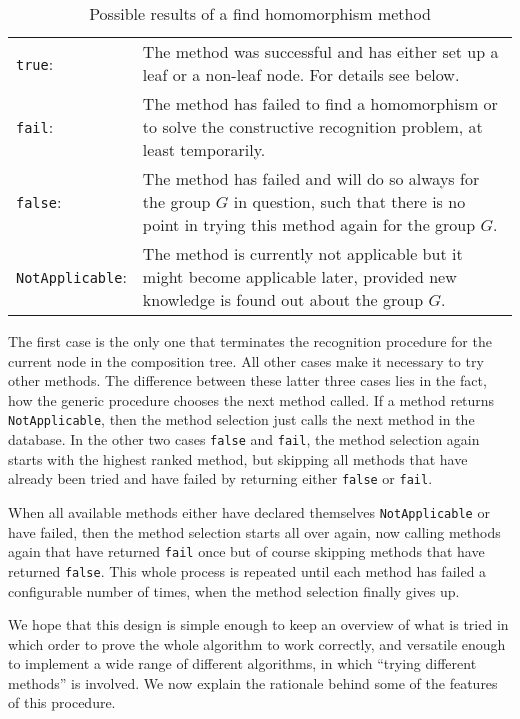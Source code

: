 \begin{table}[ht]
\begin{tabular}{lp{4in}}
\texttt{true}: &
   The method was successful and has either set up a
   leaf or a non-leaf node. For details see below. \\
\texttt{fail}: &
   The method has failed to find a homomorphism or
   to solve the constructive recognition problem, at least temporarily. \\
\texttt{false}: &
   The method has failed and will do so always for
   the group $G$ in question, such that there is no point in trying
   this method again for the group $G$. \\
\texttt{NotApplicable}: &
   The method is currently not applicable
   but it might become applicable later, provided new knowledge is
   found out about the group $G$.
\end{tabular}
\caption{Possible results of a find homomorphism method}
\label{methselresults}
\end{table}

The first case is the only one that terminates the recognition procedure
for the current node in the composition tree.
All other cases make it necessary to try other methods. The difference
between these latter three cases lies in the fact, how the generic
procedure chooses the next method called. If a method returns
\texttt{NotApplicable}, then the method selection just calls the next
method in the database. In the other two cases \texttt{false} and 
\texttt{fail}, the method selection again starts with the highest ranked
method, but skipping all methods that have already been tried and
have failed by returning either \texttt{false} or \texttt{fail}.

When all available methods either have declared themselves
\texttt{NotApplicable} or have failed, then the method selection 
starts all over again, now calling methods again that have returned
\texttt{fail} once but of course skipping methods that have returned
\texttt{false}. This whole process is repeated until each method has
failed a configurable number of times, when the method selection
finally gives up.

We hope that this design is simple enough to keep an overview of what is
tried in which order to prove the whole algorithm to work correctly,
and versatile enough to implement a wide range of different algorithms,
in which ``trying different methods'' is involved. We now explain
the rationale behind some of the features of this procedure.

